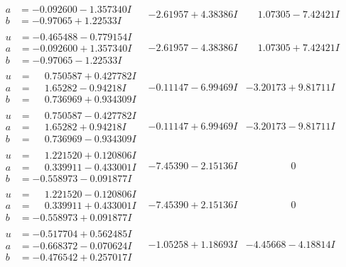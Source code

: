 \documentclass[1p]{elsarticle_modified}
\theoremstyle{definition}
\begin{document}
$$\begin{array}{c|c|c}
\begin{aligned}
a &= -0.092600 - 1.357340 I \\
b &= -0.97065 + 1.22533 I\end{aligned}
 & -2.61957 + 4.38386 I & \phantom{-}1.07305 - 7.42421 I \\ \hline\begin{aligned}
u &= -0.465488 - 0.779154 I \\
a &= -0.092600 + 1.357340 I \\
b &= -0.97065 - 1.22533 I\end{aligned}
 & -2.61957 - 4.38386 I & \phantom{-}1.07305 + 7.42421 I \\ \hline\begin{aligned}
u &= \phantom{-}0.750587 + 0.427782 I \\
a &= \phantom{-}1.65282 - 0.94218 I \\
b &= \phantom{-}0.736969 + 0.934309 I\end{aligned}
 & -0.11147 - 6.99469 I & -3.20173 + 9.81711 I \\ \hline\begin{aligned}
u &= \phantom{-}0.750587 - 0.427782 I \\
a &= \phantom{-}1.65282 + 0.94218 I \\
b &= \phantom{-}0.736969 - 0.934309 I\end{aligned}
 & -0.11147 + 6.99469 I & -3.20173 - 9.81711 I \\ \hline\begin{aligned}
u &= \phantom{-}1.221520 + 0.120806 I \\
a &= \phantom{-}0.339911 - 0.433001 I \\
b &= -0.558973 - 0.091877 I\end{aligned}
 & -7.45390 - 2.15136 I & \phantom{-0.000000 } 0 \\ \hline\begin{aligned}
u &= \phantom{-}1.221520 - 0.120806 I \\
a &= \phantom{-}0.339911 + 0.433001 I \\
b &= -0.558973 + 0.091877 I\end{aligned}
 & -7.45390 + 2.15136 I & \phantom{-0.000000 } 0 \\ \hline\begin{aligned}
u &= -0.517704 + 0.562485 I \\
a &= -0.668372 - 0.070624 I \\
b &= -0.476542 + 0.257017 I\end{aligned}
 & -1.05258 + 1.18693 I & -4.45668 - 4.18814 I \\ \hline\begin{aligned}

\end{aligned}
\end{array}$$
\end{document}
